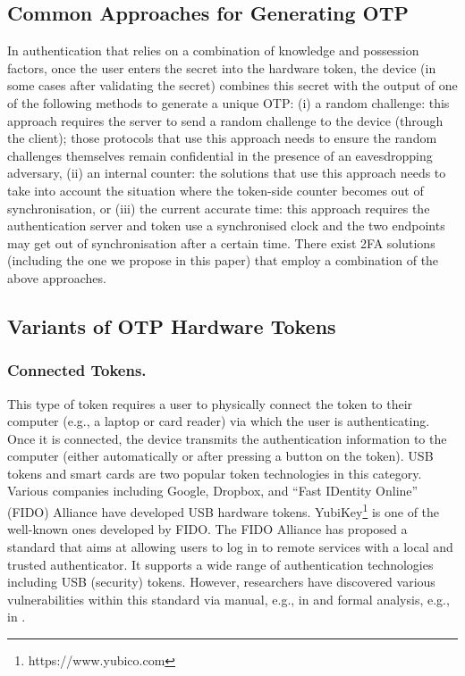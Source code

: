 \subsection{Common Approaches for Generating OTP}

In authentication that relies on a combination of knowledge and possession factors, once the user enters the secret into the hardware token, the device (in some cases after validating the secret) combines this secret with the output of one of the following methods to generate a unique OTP:  (i) a random challenge: this approach requires the server to send a random challenge to the device (through the client); those protocols that use this approach needs to ensure the random challenges themselves remain confidential in the presence of an eavesdropping adversary,  (ii) an internal counter:  the solutions that use this approach needs to take into account the situation where the token-side counter becomes out of synchronisation, or (iii) the current accurate time: this approach requires the authentication server and token use a synchronised clock and the two endpoints may get out of synchronisation after a certain time. There exist 2FA solutions (including the one we propose in this paper) that employ a combination of the above approaches. 
\subsection{Variants of OTP Hardware Tokens}

\subsubsection{Connected Tokens.}
This type of token requires a user to physically connect the token to their computer (e.g., a laptop or card reader) via which the user is authenticating. Once it is connected, the device transmits the authentication information to the computer (either automatically or after pressing a button on the token). USB tokens and smart cards are two popular token technologies in this category.  Various companies including Google, Dropbox, and  ``Fast IDentity Online'' (FIDO) Alliance have developed USB hardware tokens. YubiKey\footnote{https://www.yubico.com} is one of the well-known ones developed by FIDO. The FIDO  Alliance has proposed a standard that aims at allowing users to log in to remote services with a local and trusted authenticator. It supports a wide range of authentication technologies including USB (security) tokens. However, researchers have discovered various vulnerabilities within this standard via manual, e.g., in \cite{PanosMNPX17,ChangMSS17,LoutfiJ15} and formal analysis, e.g., in \cite{ndss/FengLP021}. 

